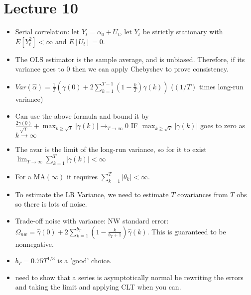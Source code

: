 \documentclass[11pt]{article} %
\begin{document}
\section{Lecture 10}
\begin{itemize}
\item Serial correlation: let $Y_t = \alpha_0 + U_t$, let $Y_t$ be strictly stationary with $E[Y_t^2]<\infty$ and $E[U_t] = 0$.
\item The OLS estimator is the sample average, and is unbiased. Therefore, if its variance goes to $0$ then we can apply Chebyshev to prove consistency.
\item $Var(\hat{\alpha}) = \frac{1}{T}\left( \gamma(0) + 2\sum_{k=1}^{T-1}\left( 1 - \frac{k}{T}\right) \gamma(k) \right)$ ($(1/T)$ times long-run variance)
\item Can use the above formula and bound it by $\frac{2\gamma(0)}{\sqrt{T}} + \max_{k\geq \sqrt{T}}|\gamma(k)| \rightarrow_{T\rightarrow \infty} 0$ IF $ \max_{k\geq \sqrt{T}}|\gamma(k)|$ goes to zero as $k\rightarrow \infty$
\item The  avar is the limit of the long-run variance, so for it to exist $\lim_{T\rightarrow\infty} \sum_{k=1}^T |\gamma(k)|<\infty$
\item For a MA$(\infty)$ it requires $\sum_{k=1}^T |\theta_k|<\infty$.
\item To estimate the LR Variance, we need to estimate $T$ covariances from $T$ obs so there is lots of noise.
\item Trade-off noise with variance: NW standard error: $\Omega_{nw} = \hat{\gamma}(0) + 2\sum_{k=1}^{b_T}\left( 1-\frac{k}{b_T + 1}\right)\hat{\gamma}(k)$. This is guaranteed to be nonnegative.
\item $b_T = 0.75T^{1/3}$ is a 'good' choice.
\item need to show that a series is asymptotically normal be rewriting the errors and taking the limit and applying CLT when you can.  
\end{itemize}
\end{document}
